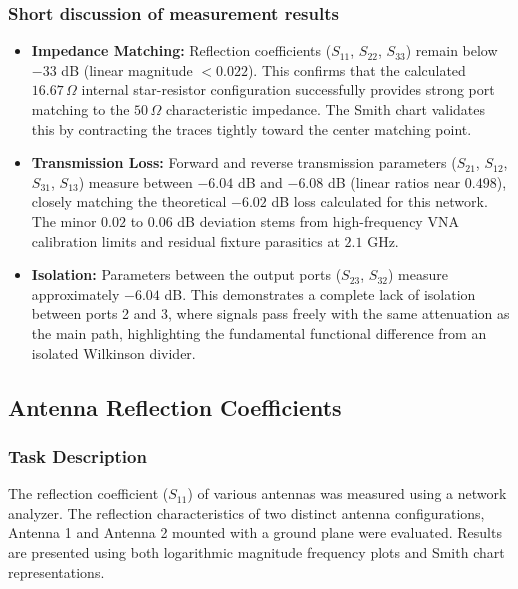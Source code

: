 \FloatBarrier

\subsubsection{Short discussion of measurement results}

\begin{itemize}
    \item \textbf{Impedance Matching:} Reflection coefficients ($S_{11}$, $S_{22}$, $S_{33}$) remain below $-33$ dB (linear magnitude $< 0.022$). This confirms that the calculated $16.67\,\Omega$ internal star-resistor configuration successfully provides strong port matching to the $50\,\Omega$ characteristic impedance. The Smith chart validates this by contracting the traces tightly toward the center matching point.
    
    \item \textbf{Transmission Loss:} Forward and reverse transmission parameters ($S_{21}$, $S_{12}$, $S_{31}$, $S_{13}$) measure between $-6.04$ dB and $-6.08$ dB (linear ratios near $0.498$), closely matching the theoretical $-6.02$ dB loss calculated for this network. The minor $0.02$ to $0.06$ dB deviation stems from high-frequency VNA calibration limits and residual fixture parasitics at $2.1$ GHz.
    
    \item \textbf{Isolation:} Parameters between the output ports ($S_{23}$, $S_{32}$) measure approximately $-6.04$ dB. This demonstrates a complete lack of isolation between ports 2 and 3, where signals pass freely with the same attenuation as the main path, highlighting the fundamental functional difference from an isolated Wilkinson divider.
\end{itemize}

\subsection{Antenna Reflection Coefficients}

\subsubsection{Task Description}
The reflection coefficient ($S_{11}$) of various antennas was measured using a network analyzer. The reflection characteristics of two distinct antenna configurations, Antenna 1 and Antenna 2 mounted with a ground plane were evaluated. Results are presented using both logarithmic magnitude frequency plots and Smith chart representations.

